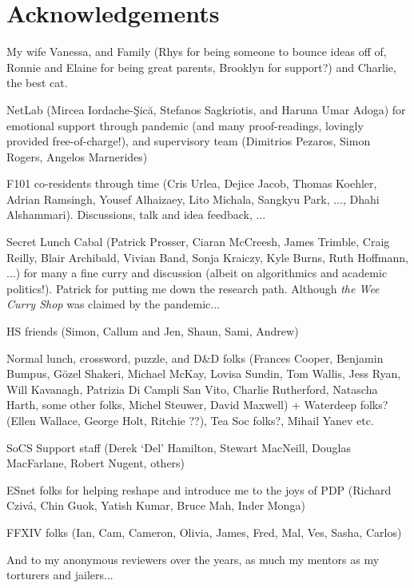 \chapter*{Acknowledgements}

My wife Vanessa, and Family (Rhys for being someone to bounce ideas off of, Ronnie and Elaine for being great parents, Brooklyn for support?) and Charlie, the best cat.

NetLab (Mircea Iordache-\c{S}ic\u{a}, Stefanos Sagkriotis, and Haruna Umar Adoga) for emotional support through pandemic (and many proof-readings, lovingly provided free-of-charge!), and supervisory team (Dimitrios Pezaros, Simon Rogers, Angelos Marnerides)

F101 co-residents through time (Cris Urlea, Dejice Jacob, Thomas Koehler, Adrian Ramsingh, Yousef Alhaizaey, Lito Michala, Sangkyu Park, ..., Dhahi Alshammari). Discussions, talk and idea feedback, ...

Secret Lunch Cabal (Patrick Prosser, Ciaran McCreesh, James Trimble, Craig Reilly, Blair Archibald, Vivian Band, Sonja Kraiczy, Kyle Burns, Ruth Hoffmann, ...) for many a fine curry and discussion (albeit on algorithmics and academic politics!). Patrick for putting me down the research path. Although \emph{the Wee Curry Shop} was claimed by the pandemic...

HS friends (Simon, Callum and Jen, Shaun, Sami, Andrew)

Normal lunch, crossword, puzzle, and D\&D folks (Frances Cooper, Benjamin Bumpus, G\"{o}zel Shakeri, Michael McKay, Lovisa Sundin, Tom Wallis, Jess Ryan, Will Kavanagh, Patrizia Di Campli San Vito, Charlie Rutherford, Natascha Harth, some other folks, Michel Steuwer, David Maxwell) + Waterdeep folks? (Ellen Wallace, George Holt, Ritchie ??), Tea Soc folks?, Mihail Yanev etc.

SoCS Support staff (Derek `Del' Hamilton, Stewart MacNeill, Douglas MacFarlane, Robert Nugent, others)

ESnet folks for helping reshape and introduce me to the joys of PDP (Richard Cziv\'{a}, Chin Guok, Yatish Kumar, Bruce Mah, Inder Monga)

FFXIV folks (Ian, Cam, Cameron, Olivia, James, Fred, Mal, Ves, Sasha, Carlos)

And to my anonymous reviewers over the years, as much my mentors as my torturers and jailers...